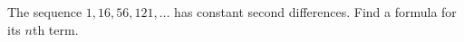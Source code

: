 The sequence $1,16,56,121,\dots$ has constant second differences. Find a formula for its $n$th term.
